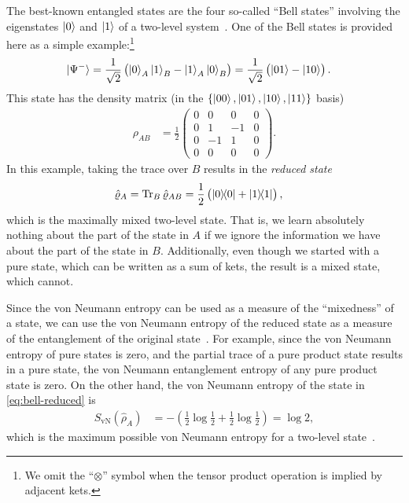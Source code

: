 The best-known entangled states are the four so-called ``Bell states'' involving the eigenstates $\ket{0}$ and $\ket{1}$ of a two-level system~\cite[88]{wilde2013quantum}.
One of the Bell states is provided here as a simple example:\footnote{
	We omit the ``$\otimes$'' symbol when the tensor product operation is implied by adjacent kets.
}
\begin{align}
	\ket{\Psi^-}
	&= \frac{1}{\sqrt{2}} \left( \ket{0}_A \ket{1}_B - \ket{1}_A \ket{0}_B \right)
	= \frac{1}{\sqrt{2}} \left( \ket{01} - \ket{10} \right).
\end{align}
This state has the density matrix (in the $\{ \ket{00}, \ket{01}, \ket{10}, \ket{11} \}$ basis)
\begin{align}
	\rho_{AB}
	&= \frac{1}{2} \begin{pmatrix}
			0 & 0 & 0 & 0 \\
			0 & 1 & -1 & 0 \\
			0 & -1 & 1 & 0 \\
			0 & 0 & 0 & 0
		\end{pmatrix}.
\end{align}
In this example, taking the trace over $B$ results in the \emph{reduced state}
\begin{align}
	\hat{\varrho}_A
	&= \operatorname{Tr}_B{\hat{\varrho}_{AB}}
	= \frac{1}{2} \left( \ket{0}\!\!\bra{0} + \ket{1}\!\!\bra{1} \right),
		\label{eq:bell-reduced}
\end{align}
which is the maximally mixed two-level state.
That is, we learn absolutely nothing about the part of the state in $A$ if we ignore the information we have about the part of the state in $B$.
Additionally, even though we started with a pure state, which can be written as a sum of kets, the result is a mixed state, which cannot.

Since the von Neumann entropy can be used as a measure of the ``mixedness'' of a state, we can use the von Neumann entropy of the reduced state as a measure of the entanglement of the original state~\cite{schumacher1995quantum,vedral1997quantifying}.
For example, since the von Neumann entropy of pure states is zero, and the partial trace of a pure product state results in a pure state, the von Neumann entanglement entropy of any pure product state is zero.
On the other hand, the von Neumann entropy of the state in \cref{eq:bell-reduced} is
\begin{align}
	S_\mathrm{vN}(\hat{\rho}_A)
	&= -\left( \frac{1}{2} \log{\frac{1}{2}} + \frac{1}{2} \log{\frac{1}{2}} \right)
	= \log{2},
\end{align}
which is the maximum possible von Neumann entropy for a two-level state~\cite[255]{wilde2013quantum}.

